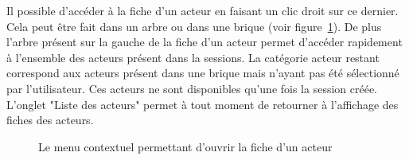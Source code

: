 Il possible d'accéder à la fiche d'un acteur en faisant un clic droit sur ce dernier. Cela peut être fait dans un arbre ou dans une brique (voir figure~\ref{menu_fiche_acteur}). De plus l'arbre présent sur la gauche de la fiche d'un acteur permet d'accéder rapidement à l'ensemble des acteurs présent dans la sessions. La catégorie acteur restant correspond aux acteurs présent dans une brique mais n'ayant pas été sélectionné par l'utilisateur. Ces acteurs ne sont disponibles qu'une fois la session créée.\\

L'onglet "Liste des acteurs" permet à tout moment de retourner à l'affichage des fiches des acteurs.


\begin{figure}[h!t]
\centering
{}

\caption{Le menu contextuel permettant d'ouvrir la fiche d'un acteur}

\label{menu_fiche_acteur}
\end{figure}

